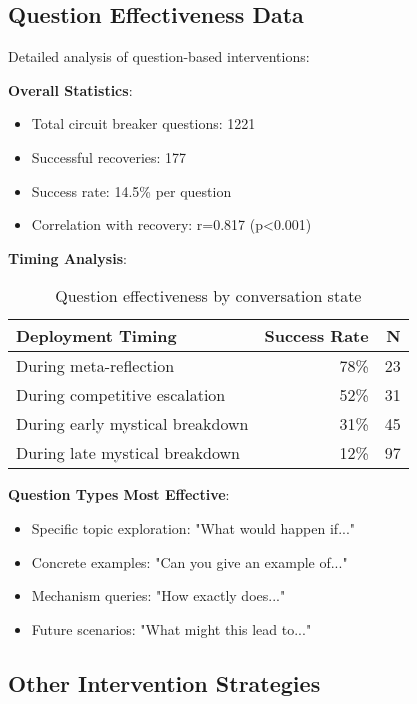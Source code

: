 \documentclass[11pt,letterpaper]{article}
\newcommand{\exponedataQuestionCorrelation}{0.817}
\newcommand{\exponedataQuestionPValue}{p\textless0.001}
\newcommand{\exponedataTotalQuestions}{1221}
\newcommand{\exponedataTotalRecoveries}{177}
\newcommand{\exponedataQuestionSuccessRate}{14.5\%} %
\begin{document}
\subsection{Question Effectiveness Data}

Detailed analysis of question-based interventions:

\textbf{Overall Statistics}:
\begin{itemize}
    \item Total circuit breaker questions: \exponedataTotalQuestions{}
    \item Successful recoveries: \exponedataTotalRecoveries{}
    \item Success rate: \exponedataQuestionSuccessRate{} per question
    \item Correlation with recovery: r=\exponedataQuestionCorrelation{} (\exponedataQuestionPValue{})
\end{itemize}

\textbf{Timing Analysis}:
\begin{table}[h]
\centering
\begin{tabular}{lrr}
\toprule
\textbf{Deployment Timing} & \textbf{Success Rate} & \textbf{N} \\
\midrule
During meta-reflection & 78\% & 23 \\
During competitive escalation & 52\% & 31 \\
During early mystical breakdown & 31\% & 45 \\
During late mystical breakdown & 12\% & 97 \\
\bottomrule
\end{tabular}
\caption{Question effectiveness by conversation state}
\label{tab:question_timing}
\end{table}

\textbf{Question Types Most Effective}:
\begin{itemize}
    \item Specific topic exploration: "What would happen if..."
    \item Concrete examples: "Can you give an example of..."
    \item Mechanism queries: "How exactly does..."
    \item Future scenarios: "What might this lead to..."
\end{itemize}

\subsection{Other Intervention Strategies}
\end{document}
